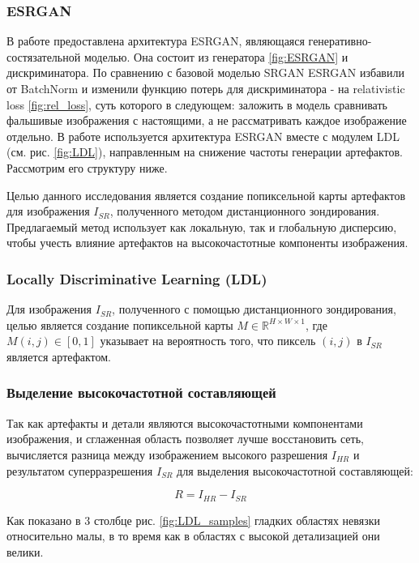 \documentclass[14pt]{extarticle}
\begin{document}
\subsubsection{ESRGAN}
В работе \cite{wang2018esrgan} предоставлена архитектура ESRGAN, являющаяся генеративно-состязательной моделью. Она состоит из генератора \ref{fig:ESRGAN} и дискриминатора. По сравнению с базовой моделью SRGAN \cite{SRGAN} ESRGAN избавили от BatchNorm и изменили функцию потерь для дискриминатора - на relativistic loss \ref{fig:rel_loss}, суть которого в следующем: заложить в модель сравнивать фальшивые изображения с настоящими, а не рассматривать каждое изображение отдельно.
В работе \cite{LDL2022} используется архитектура ESRGAN вместе с модулем LDL (см. рис. \ref{fig:LDL}), направленным на снижение частоты генерации артефактов. Рассмотрим его структуру ниже.


Целью данного исследования является создание попиксельной карты артефактов для изображения $I_{SR}$, полученного методом дистанционного зондирования. Предлагаемый метод использует как локальную, так и глобальную дисперсию, чтобы учесть влияние артефактов на высокочастотные компоненты изображения.

\subsubsection{Locally Discriminative Learning (\textbf{LDL})}

Для изображения $I_{SR}$, полученного с помощью дистанционного зондирования, целью является создание попиксельной карты $M \in \mathbb{R}^{H \times W \times 1}$, где $M(i,j) \in [0,1]$ указывает на вероятность того, что пиксель $(i,j)$ в $I_{SR}$ является артефактом. 

\subsubsection{Выделение высокочастотной составляющей}

Так как артефакты и детали являются высокочастотными компонентами изображения, и сглаженная область позволяет лучше восстановить сеть, вычисляется разница между изображением высокого разрешения $I_{HR}$ и результатом суперразрешения $I_{SR}$ для выделения высокочастотной составляющей:

$$
R = I_{HR} - I_{SR}
$$

Как показано в 3 столбце рис. \ref{fig:LDL_samples} гладких областях невязки относительно малы, в то время как в областях с высокой детализацией они велики.
\end{document}

